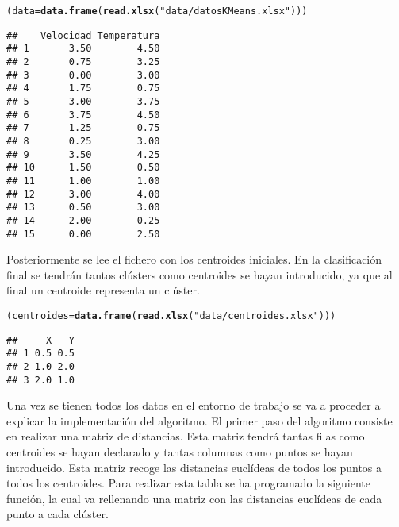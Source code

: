 \documentclass[12pt]{report}\usepackage[]{graphicx}\usepackage[dvipsnames]{xcolor}
\makeatletter
\newcommand{\hlstr}[1]{\textcolor[rgb]{0.192,0.494,0.8}{#1}}%
\newcommand{\hlstd}[1]{\textcolor[rgb]{0.345,0.345,0.345}{#1}}%
\newcommand{\hlkwb}[1]{\textcolor[rgb]{0.69,0.353,0.396}{#1}}%
\newcommand{\hlkwd}[1]{\textcolor[rgb]{0.737,0.353,0.396}{\textbf{#1}}}%
\newenvironment{kframe}{%
 \def\at@end@of@kframe{}%
 \ifinner\ifhmode%
  \def\at@end@of@kframe{\end{minipage}}%
  \begin{minipage}{\columnwidth}%
 \fi\fi%
 \def\FrameCommand##1{\hskip\@totalleftmargin \hskip-\fboxsep
 \colorbox{shadecolor}{##1}\hskip-\fboxsep
     \hskip-\linewidth \hskip-\@totalleftmargin \hskip\columnwidth}%
 \MakeFramed {\advance\hsize-\width
   \@totalleftmargin\z@ \linewidth\hsize
   \@setminipage}}%
 {\par\unskip\endMakeFramed%
 \at@end@of@kframe}
\newenvironment{knitrout}{}{} %
\makeatother
\begin{document}
\begin{knitrout}
\color{fgcolor}\begin{kframe}
\begin{alltt}
\hlstd{(data} \hlkwb{=} \hlkwd{data.frame}\hlstd{(}\hlkwd{read.xlsx}\hlstd{(}\hlstr{"data/datosKMeans.xlsx"}\hlstd{)))}
\end{alltt}
\begin{verbatim}
##    Velocidad Temperatura
## 1       3.50        4.50
## 2       0.75        3.25
## 3       0.00        3.00
## 4       1.75        0.75
## 5       3.00        3.75
## 6       3.75        4.50
## 7       1.25        0.75
## 8       0.25        3.00
## 9       3.50        4.25
## 10      1.50        0.50
## 11      1.00        1.00
## 12      3.00        4.00
## 13      0.50        3.00
## 14      2.00        0.25
## 15      0.00        2.50
\end{verbatim}
\end{kframe}
\end{knitrout}
				 
				 Posteriormente se lee el fichero con los centroides iniciales. En la clasificación final se tendrán tantos clústers como centroides se hayan introducido, ya que al final un centroide representa un clúster.
				 
\begin{knitrout}
\color{fgcolor}\begin{kframe}
\begin{alltt}
\hlstd{(centroides} \hlkwb{=} \hlkwd{data.frame}\hlstd{(}\hlkwd{read.xlsx}\hlstd{(}\hlstr{"data/centroides.xlsx"}\hlstd{)))}
\end{alltt}
\begin{verbatim}
##     X   Y
## 1 0.5 0.5
## 2 1.0 2.0
## 3 2.0 1.0
\end{verbatim}
\end{kframe}
\end{knitrout}
				 
				 Una vez se tienen todos los datos en el entorno de trabajo se va a proceder a explicar la implementación del algoritmo. El primer paso del algoritmo consiste en realizar una matriz de distancias. Esta matriz tendrá tantas filas como centroides se hayan declarado y tantas columnas como puntos se hayan introducido. Esta matriz recoge las distancias euclídeas de todos los puntos a todos los centroides. Para realizar esta tabla se ha programado la siguiente función, la cual va rellenando una matriz con las distancias euclídeas de cada punto a cada clúster.
				 
\end{document}
